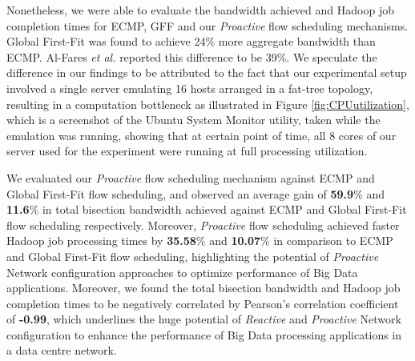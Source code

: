 Nonetheless, we were able to evaluate the bandwidth achieved and Hadoop job completion times for ECMP, GFF and our \textit{Proactive} flow scheduling mechanisms. Global First-Fit was found to achieve 24\% more aggregate bandwidth than ECMP. Al-Fares \textit{et al.} reported this difference to be 39\%. We speculate the difference in our findings to be attributed to the fact that our experimental setup involved a single server emulating 16 hosts arranged in a fat-tree topology, resulting in a  computation bottleneck as illustrated in Figure \ref{fig:CPUutilization}, which is a screenshot of the Ubuntu System Monitor utility, taken while the emulation was running, showing that at certain point of time, all 8 cores of our server used for the experiment were running at full processing utilization. 

We evaluated our \textit{Proactive} flow scheduling mechanism against ECMP and Global First-Fit flow scheduling, and observed an average gain of \textbf{59.9}\% and \textbf{11.6}\% in total bisection bandwidth achieved against ECMP and Global First-Fit flow scheduling respectively. Moreover, \textit{Proactive} flow scheduling achieved faster Hadoop job processing times by \textbf{35.58}\% and \textbf{10.07}\% in comparison to ECMP and Global First-Fit flow scheduling, highlighting the potential of \textit{Proactive} Network configuration approaches to optimize performance of Big Data applications. Moreover, we found the total bisection bandwidth and Hadoop job completion times to be negatively correlated by Pearson's correlation coefficient of \textbf{-0.99}, which underlines the huge potential of \textit{Reactive} and \textit{Proactive} Network configuration to enhance the performance of Big Data processing applications in a data centre network.